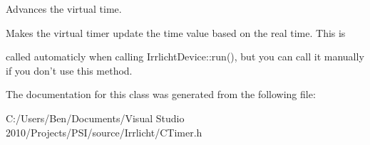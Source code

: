 Advances the virtual time. 

\begin{DoxyVerb}Makes the virtual timer update the time value based on the real time. This is
\end{DoxyVerb}
 called automaticly when calling Irrlicht\-Device\-::run(), but you can call it manually if you don't use this method. 

The documentation for this class was generated from the following file\-:\begin{DoxyCompactItemize}
\item 
C\-:/\-Users/\-Ben/\-Documents/\-Visual Studio 2010/\-Projects/\-P\-S\-I/source/\-Irrlicht/C\-Timer.\-h\end{DoxyCompactItemize}
